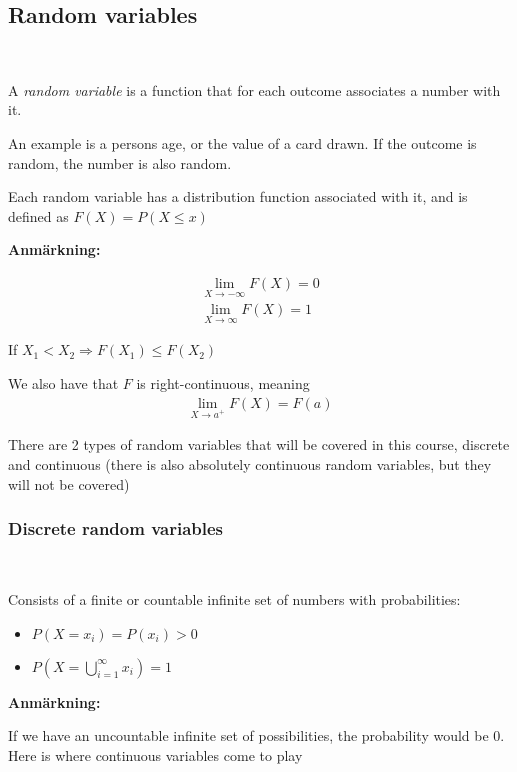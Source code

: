 \subsection{Random variables}\hfill\\\par
\begin{theo}{}
  A \textit{random variable} is a function that for each outcome associates a number with it.
  \par\bigskip
  \noindent An example is a persons age, or the value of a card drawn. If the outcome is random, the number is also random.
\end{theo}
\par\bigskip
\noindent Each random variable has a distribution function associated with it, and is defined as $F(X) = P(X\leq x)$
\par\bigskip
\noindent\textbf{Anmärkning:}\par

\begin{equation*}
  \begin{gathered}
    \lim_{X\to-\infty}F(X)=0\\
    \lim_{X\to\infty}F(X) = 1
  \end{gathered}
\end{equation*}
\par\bigskip
\noindent If $X_1<X_2\Rightarrow F(X_1)\leq F(X_2)$
\par\bigskip
\noindent We also have that $F$ is right-continuous, meaning
\begin{equation*}
  \begin{gathered}
    \lim_{X\to a^+}F(X) = F(a)
  \end{gathered}
\end{equation*}
\par\bigskip
\noindent There are 2 types of random variables that will be covered in this course, discrete and continuous (there is also absolutely continuous random variables, but they will not be covered)
\par\bigskip
\subsubsection{Discrete random variables}\hfill\\
\par\bigskip
\begin{theo}{}
  Consists of a finite or countable infinite set of numbers with probabilities:\par
  \begin{itemize}
    \item $P(X=x_i)=P(x_i)>0$
    \item $P(X = \bigcup_{i=1}^{\infty}x_i) = 1$
  \end{itemize}
\end{theo}
\par\bigskip
\noindent\textbf{Anmärkning:}\par
\noindent If we have an uncountable infinite set of possibilities, the probability would be 0. Here is where continuous variables come to play
\par\bigskip
